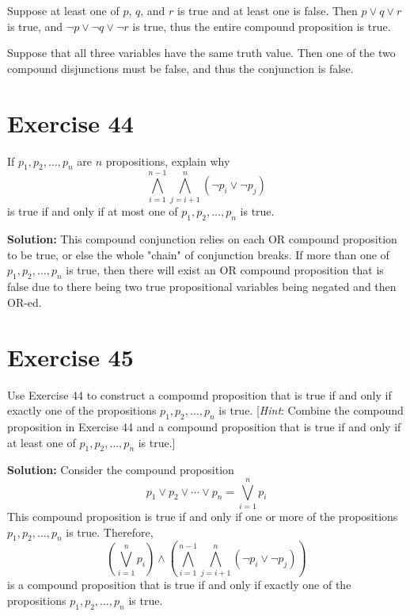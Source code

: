 \documentclass{Axon}
\begin{document}
Suppose at least one of \(p\), \(q\), and \(r\) is true and at least one is false. Then \(p \lor q \lor r\) is true, and \(\lnot p \lor \lnot q \lor \lnot r\) is true, thus the entire compound proposition is true.

Suppose that all three variables have the same truth value. Then one of the two compound disjunctions must be false, and thus the conjunction is false.

\section*{Exercise 44}
If \(p_1, p_2, \ldots, p_n\) are \(n\) propositions, explain why
\begin{equation*}
    \bigwedge_{i = 1}^{n - 1} \bigwedge_{j = i + 1}^n (\lnot p_i \lor \lnot p_j)
\end{equation*}
is true if and only if at most one of \(p_1, p_2, \ldots, p_n\) is true.

\noindent
\textbf{Solution:}
This compound conjunction relies on each OR compound proposition to be true, or else the whole "chain" of conjunction breaks. If more than one of \(p_1, p_2, \ldots, p_n\) is true, then there will exist an OR compound proposition that is false due to there being two true propositional variables being negated and then OR-ed.

\section*{Exercise 45}
Use Exercise 44 to construct a compound proposition that is true if and only if exactly one of the propositions \(p_1, p_2, \ldots, p_n\) is true. [\textit{Hint}: Combine the compound proposition in Exercise 44 and a compound proposition that is true if and only if at least one of \(p_1, p_2, \ldots, p_n\) is true.]

\noindent
\textbf{Solution:}
Consider the compound proposition
\begin{equation*}
    p_1 \lor p_2 \lor \cdots \lor p_n = \bigvee_{i = 1}^n p_i
\end{equation*}
This compound proposition is true if and only if one or more of the propositions \(p_1, p_2, \ldots, p_n\) is true. Therefore,
\begin{equation*}
    \left(\bigvee_{i = 1}^n p_i\right) \land \left(\bigwedge_{i = 1}^{n - 1} \bigwedge_{j = i + 1}^n (\lnot p_i \lor \lnot p_j)\right)
\end{equation*}
is a compound proposition that is true if and only if exactly one of the propositions \(p_1, p_2, \ldots, p_n\) is true.
\end{document}
